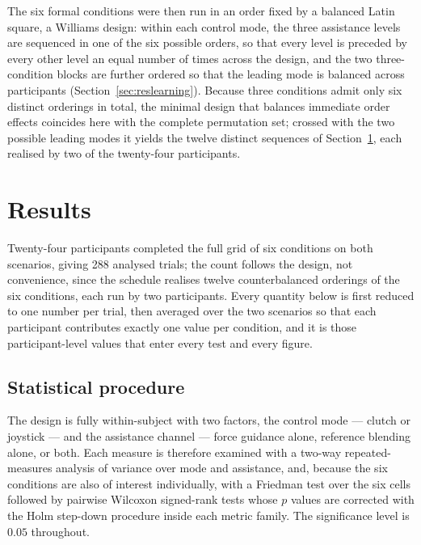 \documentclass[12pt,a4paper,twoside,openright]{report}
\begin{document}
The six formal conditions were then run in an order fixed by a balanced Latin square, a Williams design: within each control mode, the three assistance levels are sequenced in one of the six possible orders, so that every level is preceded by every other level an equal number of times across the design, and the two three-condition blocks are further ordered so that the leading mode is balanced across participants (Section~\ref{sec:reslearning}). Because three conditions admit only six distinct orderings in total, the minimal design that balances immediate order effects coincides here with the complete permutation set; crossed with the two possible leading modes it yields the twelve distinct sequences of Section~\ref{sec:results}, each realised by two of the twenty-four participants.

\section{Results}
\label{sec:results}

Twenty-four participants completed the full grid of six conditions on both scenarios, giving 288 analysed trials; the count follows the design, not convenience, since the schedule realises twelve counterbalanced orderings of the six conditions, each run by two participants. Every quantity below is first reduced to one number per trial, then averaged over the two scenarios so that each participant contributes exactly one value per condition, and it is those participant-level values that enter every test and every figure.

\subsection{Statistical procedure}
\label{sec:stats}

The design is fully within-subject with two factors, the control mode --- clutch or joystick --- and the assistance channel --- force guidance alone, reference blending alone, or both. Each measure is therefore examined with a two-way repeated-measures analysis of variance over mode and assistance, and, because the six conditions are also of interest individually, with a Friedman test over the six cells followed by pairwise Wilcoxon signed-rank tests whose $p$ values are corrected with the Holm step-down procedure inside each metric family. The significance level is $0.05$ throughout.
\end{document}
